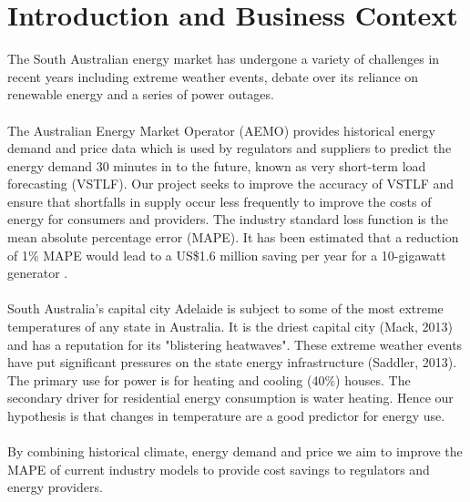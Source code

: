 \documentclass[11pt]{article}
\begin{document}
\newpage
\tableofcontents
\newpage
\setcounter{page}{1}
\section{Introduction and Business Context}

The South Australian energy market has undergone a variety of challenges in recent years including extreme weather events, debate over its reliance on renewable energy and a series of power outages. 
\\
\\
The Australian Energy Market Operator (AEMO) provides historical energy demand and price data which is used by regulators and suppliers to predict the energy demand 30 minutes in to the future, known as very short-term load forecasting (VSTLF). Our project seeks to improve the accuracy of VSTLF and ensure that shortfalls in supply occur less frequently to improve the costs of energy for consumers and providers. The industry standard loss function is the mean absolute percentage error (MAPE). It has been estimated that a reduction of 1\% MAPE would lead to a US\$1.6 million saving per year for a 10-gigawatt generator \citep{hobbs_analysis_1999}. 
\\
\\
South Australia's capital city Adelaide is subject to some of the most extreme temperatures of any state in Australia. It is the driest capital city (Mack, 2013) and has a reputation for its "blistering heatwaves". These extreme weather events have put significant pressures on the state energy infrastructure (Saddler, 2013). The primary use for power is for heating and cooling (40\%) houses. The secondary driver for residential energy consumption is water heating. Hence our hypothesis is that changes in temperature are a good predictor for energy use. 
\\
\\
By combining historical climate, energy demand and price we aim to improve the MAPE of current industry models to provide cost savings to regulators and energy providers. 
\end{document}

